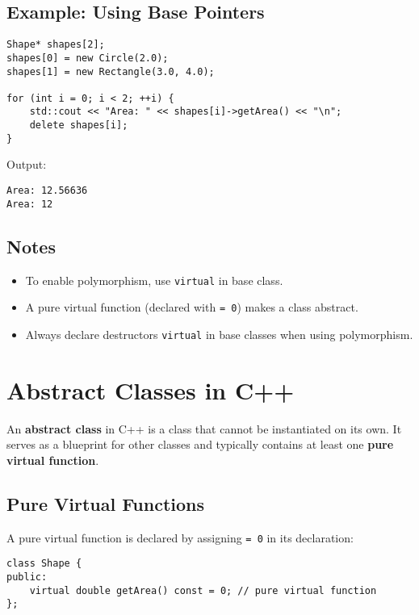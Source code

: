 \documentclass{article}
\begin{document}
\subsection{Example: Using Base Pointers}

\begin{lstlisting}[style=cppstyle]
Shape* shapes[2];
shapes[0] = new Circle(2.0);
shapes[1] = new Rectangle(3.0, 4.0);

for (int i = 0; i < 2; ++i) {
    std::cout << "Area: " << shapes[i]->getArea() << "\n";
    delete shapes[i];
}
\end{lstlisting}

\noindent Output:
\begin{verbatim}
Area: 12.56636
Area: 12
\end{verbatim}

\subsection{Notes}

\begin{itemize}
    \item To enable polymorphism, use \texttt{virtual} in base class.
    \item A pure virtual function (declared with \texttt{= 0}) makes a class abstract.
    \item Always declare destructors \texttt{virtual} in base classes when using polymorphism.
\end{itemize}


\section{Abstract Classes in C++}

An \textbf{abstract class} in C++ is a class that cannot be instantiated on its own. It serves as a blueprint for other classes and typically contains at least one \textbf{pure virtual function}.

\subsection{Pure Virtual Functions}

A pure virtual function is declared by assigning \texttt{= 0} in its declaration:

\begin{lstlisting}[style=cppstyle]
class Shape {
public:
    virtual double getArea() const = 0; // pure virtual function
};
\end{lstlisting}
\end{document}
